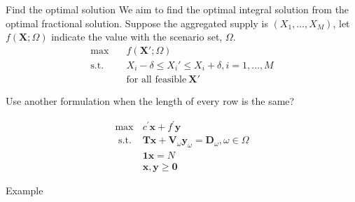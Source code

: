 \begin{frame}{Find the optimal solution}
  We aim to find the optimal integral solution from the optimal fractional solution.
  Suppose the aggregated supply is $(X_1, \ldots, X_M)$, let $f(\bm{X}; \Omega)$ indicate the value with the scenario set, $\Omega$.
  \begin{equation*}
    \begin{aligned}
    \max \quad & f(\bm{X{'}}; \Omega) \\
    \text {s.t.} \quad & X_i -\delta \leq X_i{'} \leq X_i + \delta, i = 1,\ldots, M \\
    & \text{for all feasible} ~\bm{X{'}}
    \end{aligned}
  \end{equation*}

Use another formulation when the length of every row is the same?

$$
\begin{array}{ll}
\max & c^{\prime} \mathbf{x}+f^{\prime} \mathbf{y} \\
\text { s.t. } & \mathbf{T} \mathbf{x}+\mathbf{V}_\omega \mathbf{y}_\omega=\mathbf{D}_\omega, \omega \in \Omega \\
& \mathbf{1} \mathbf{x}=N \\
& \mathbf{x}, \mathbf{y} \geq \mathbf{0}
\end{array}
$$

\end{frame}



\begin{frame}{Example}
  
\end{frame}